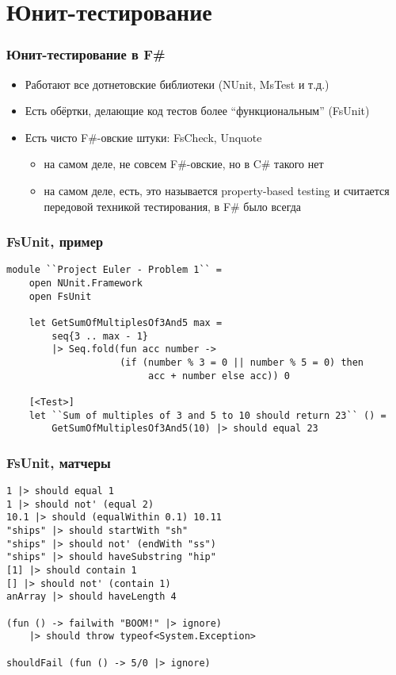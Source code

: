 \documentclass{../../slides-style}
\begin{document}
    
    \frame{\titlepage}

    \section{Юнит-тестирование}

    \begin{frame}
        \frametitle{Юнит-тестирование в F\#}
        \begin{itemize}
            \item Работают все дотнетовские библиотеки (NUnit, MsTest и т.д.)
            \item Есть обёртки, делающие код тестов более ``функциональным'' (FsUnit)
            \item Есть чисто F\#-овские штуки: FsCheck, Unquote 
            \begin{itemize}
                \item на самом деле, не совсем F\#-овские, но в C\# такого нет
                \item на самом деле, есть, это называется property-based testing и считается передовой техникой тестирования, в F\# было всегда
            \end{itemize}
        \end{itemize}
    \end{frame}

    \begin{frame}[fragile]
        \frametitle{FsUnit, пример}
        \begin{verbatim}
module ``Project Euler - Problem 1`` =
    open NUnit.Framework
    open FsUnit

    let GetSumOfMultiplesOf3And5 max =
        seq{3 .. max - 1} 
        |> Seq.fold(fun acc number ->
                    (if (number % 3 = 0 || number % 5 = 0) then
                         acc + number else acc)) 0

    [<Test>]
    let ``Sum of multiples of 3 and 5 to 10 should return 23`` () =
        GetSumOfMultiplesOf3And5(10) |> should equal 23
        \end{verbatim}
    \end{frame}

    \begin{frame}[fragile]
        \frametitle{FsUnit, матчеры}
        \begin{verbatim}
1 |> should equal 1
1 |> should not' (equal 2)
10.1 |> should (equalWithin 0.1) 10.11
"ships" |> should startWith "sh"
"ships" |> should not' (endWith "ss")
"ships" |> should haveSubstring "hip"
[1] |> should contain 1
[] |> should not' (contain 1)
anArray |> should haveLength 4

(fun () -> failwith "BOOM!" |> ignore) 
    |> should throw typeof<System.Exception>

shouldFail (fun () -> 5/0 |> ignore)
        \end{verbatim}
    \end{frame}
\end{document}
